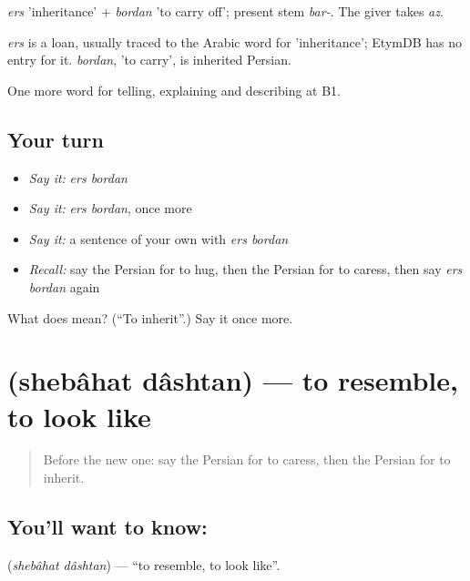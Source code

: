 \emph{ers} 'inheritance' + \emph{bordan} 'to carry off'; present stem \emph{bar-}. The giver takes \emph{az}.

\begin{cousinweb}
\emph{ers} is a loan, usually traced to the Arabic word for 'inheritance'; EtymDB has no entry for it. \emph{bordan}, 'to carry', is inherited Persian.
\end{cousinweb}

\begin{grammarlens}[title={What you've built}]
One more word for telling, explaining and describing at B1.
\end{grammarlens}

\subsection*{Your turn}
\begin{itemize}
\raggedright
  \item \emph{Say it:} \emph{ers bordan}
  \item \emph{Say it:} \emph{ers bordan}, once more
  \item \emph{Say it:} a sentence of your own with \emph{ers bordan}
  \item \emph{Recall:} say the Persian for to hug, then the Persian for to caress, then say \emph{ers bordan} again
\end{itemize}

\begin{tcolorbox}[breakable,colback=teal!4,colframe=teal!35!black,title={Before you move on}]
What does   mean? (\textquotedblleft{}To inherit\textquotedblright{}.) Say it once more.
\end{tcolorbox}
\section[\texorpdfstring{\fa{شباهت} \fa{داشتن} (shebâhat dâshtan)}{شباهت داشتن (shebâhat dâshtan)}]{  (shebâhat dâshtan) — to resemble, to look like}

\label{lesson:FA-C506-shebahat-dashtan}



\begin{quote}
Before the new one: say the Persian for to caress, then the Persian for to inherit.
\end{quote}

\subsection*{You'll want to know:  }
\textbf{ } (\emph{shebâhat dâshtan}) — \textquotedblleft{}to resemble, to look like\textquotedblright{}.


